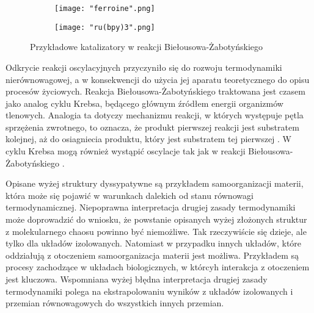 \documentclass[10pt, a4paper, twoside, onecolumn]{article}
\numberwithin{equation}{section}
\begin{document}
	\begin{figure}[H]
		\centering
		\begin{subfigure}{0.45\textwidth}
			\centering
			\texttt{[image: "ferroine".png]}
			\caption{\cite{sigmaaldrich}}
			\label{fig:ferroine}
		\end{subfigure}
		\begin{subfigure}{0.45\textwidth}
			\centering
			\texttt{[image: "ru(bpy)3".png]}
			\caption{\cite{sigmaaldrich}}
			\label{fig:rubpy}
		\end{subfigure}
		\caption{Przykładowe katalizatory w reakcji Biełousowa-Żabotyńskiego}
	\end{figure}
	Odkrycie reakcji oscylacyjnych przyczyniło się do rozwoju termodynamiki nierównowagowej, a w konsekwencji do użycia jej aparatu teoretycznego do opisu procesów życiowych. 
	Reakcja Biełousowa-Żabotyńskiego traktowana jest czasem jako analog cyklu Krebsa, będącego głównym źródłem energii organizmów tlenowych. Analogia ta dotyczy mechanizmu reakcji, w których występuje pętla sprzężenia zwrotnego, to oznacza, że produkt pierwszej reakcji jest substratem kolejnej, aż do osiagniecia produktu, który jest substratem tej pierwszej \cite{belousov_hist, stryer}. W cyklu Krebsa mogą również wystąpić oscylacje tak jak w reakcji Biełousowa-Żabotyńskiego \cite{krebs_oscillations}. \par
	Opisane wyżej struktury dyssypatywne są przykładem samoorganizacji materii, która może się pojawić w warunkach dalekich od stanu równowagi termodynamicznej. Niepoprawna interpretacja drugiej zasady termodynamiki może doprowadzić do wniosku, że powstanie opisanych wyżej złożonych struktur z molekularnego chaosu powinno być niemożliwe. Tak rzeczywiście się dzieje, ale tylko dla układów izolowanych. Natomiast w przypadku innych układów, które oddziałują z otoczeniem samoorganizacja materii jest możliwa. Przykładem są procesy zachodzące w układach biologicznych, w którcyh interakcja z otoczeniem jest kluczowa. %
	Wspomniana wyżej błędna interpretacja drugiej zasady termodynamiki polega na ekstrapolowaniu wyników z układów izolowanych i przemian równowagowych do wszystkich innych przemian.
	
	
\end{document}
